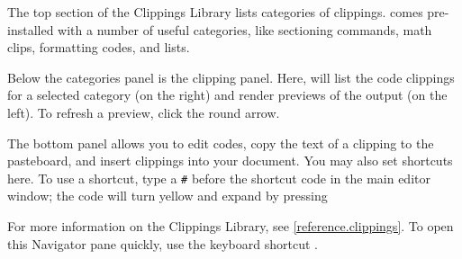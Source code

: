 The top section of the Clippings Library lists categories of clippings. \texnicle comes pre-installed with a number of useful categories, like sectioning commands, math clips, formatting codes, and lists.

Below the categories panel is the clipping panel. Here, \texnicle will list the code clippings for a selected category (on the right) and render previews of the output (on the left). To refresh a preview, click the round arrow.

The bottom panel allows you to edit codes, copy the text of a clipping to the pasteboard, and insert clippings into your document. You may also set shortcuts here. To use a shortcut, type a \verb|#| before the shortcut code in the main editor window; the code will turn yellow and expand by pressing \keys{\returnkey}

For more information on the Clippings Library, see \ref{reference.clippings}. To open this Navigator pane quickly, use the keyboard shortcut .
\pagebreak\clearpage

